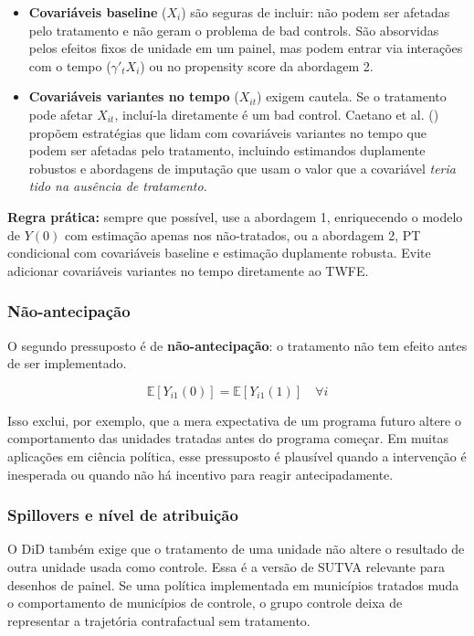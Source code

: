 \documentclass[
]{article}
\begin{document}
\begin{itemize}
\item
  \textbf{Covariáveis baseline} (\(X_i\)) são seguras de incluir: não podem ser afetadas pelo tratamento e não geram o problema de bad controls. São absorvidas pelos efeitos fixos de unidade em um painel, mas podem entrar via interações com o tempo (\(\gamma'_t X_i\)) ou no propensity score da abordagem 2.
\item
  \textbf{Covariáveis variantes no tempo} (\(X_{it}\)) exigem cautela. Se o tratamento pode afetar \(X_{it}\), incluí-la diretamente é um bad control. Caetano et al. () propõem estratégias que lidam com covariáveis variantes no tempo que podem ser afetadas pelo tratamento, incluindo estimandos duplamente robustos e abordagens de imputação que usam o valor que a covariável \emph{teria tido na ausência de tratamento}.
\end{itemize}

\textbf{Regra prática:} sempre que possível, use a abordagem 1, enriquecendo o modelo de \(Y(0)\) com estimação apenas nos não-tratados, ou a abordagem 2, PT condicional com covariáveis baseline e estimação duplamente robusta. Evite adicionar covariáveis variantes no tempo diretamente ao TWFE.

\subsubsection{Não-antecipação}\label{nuxe3o-antecipauxe7uxe3o}

O segundo pressuposto é de \textbf{não-antecipação}: o tratamento não tem efeito antes de ser implementado.

\[
\mathbb{E}[Y_{i1}(0)] = \mathbb{E}[Y_{i1}(1)] \quad \forall i
\]

Isso exclui, por exemplo, que a mera expectativa de um programa futuro altere o comportamento das unidades tratadas antes do programa começar. Em muitas aplicações em ciência política, esse pressuposto é plausível quando a intervenção é inesperada ou quando não há incentivo para reagir antecipadamente.

\subsubsection{Spillovers e nível de atribuição}\label{spillovers-e-nuxedvel-de-atribuiuxe7uxe3o}

O DiD também exige que o tratamento de uma unidade não altere o resultado de outra unidade usada como controle. Essa é a versão de SUTVA relevante para desenhos de painel. Se uma política implementada em municípios tratados muda o comportamento de municípios de controle, o grupo controle deixa de representar a trajetória contrafactual sem tratamento.
\end{document}
